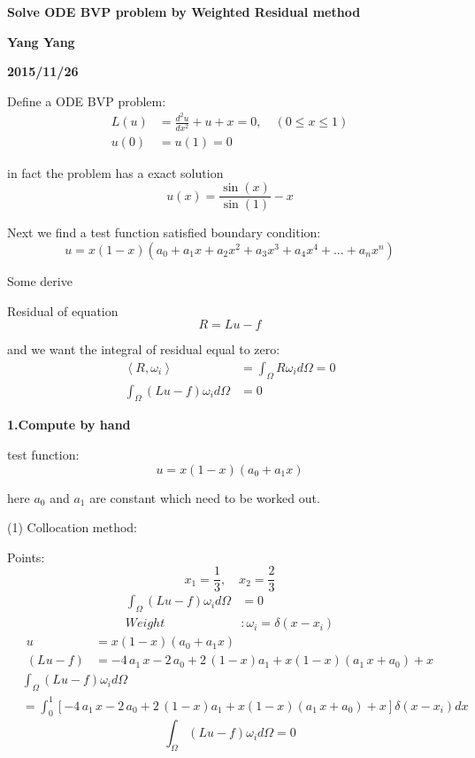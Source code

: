 \documentclass{article}%
\begin{document}
\begin{center}
\textbf{Solve ODE BVP problem by Weighted Residual method}
\end{center}

\begin{flushright}
\textbf{Yang Yang}

\textbf{2015/11/26}
\end{flushright}

Define a ODE BVP problem:%
\begin{align*}
L\left(  u\right)   &  =\frac{d^{2}u}{dx^{2}}+u+x=0,\quad\left(  0\leq
x\leq1\right) \\
u\left(  0\right)   &  =u\left(  1\right)  =0
\end{align*}


in fact the problem has a exact solution%
\[
u\left(  x\right)  =\frac{\sin\left(  x\right)  }{\sin\left(  1\right)  }-x
\]


Next we find a test function satisfied boundary condition:%
\[
u=x\left(  1-x\right)  \left(  a_{0}+a_{1}x+a_{2}x^{2}+a_{3}x^{3}+a_{4}%
x^{4}+...+a_{n}x^{n}\right)
\]


Some derive

Residual of equation%
\[
R=Lu-f
\]


and we want the integral of residual equal to zero:
\begin{align*}
\left\langle R,\omega_{i}\right\rangle  &  =\int_{\Omega}R\omega_{i}%
d\Omega=0\\
\int_{\Omega}\left(  Lu-f\right)  \omega_{i}d\Omega &  =0
\end{align*}


\textbf{1.Compute by hand}

test function:%
\[
u=x\left(  1-x\right)  \left(  a_{0}+a_{1}x\right)
\]


here $a_{0}$ and $a_{1}$ are constant which need to be worked out.

(1) Collocation method:

Points:%
\[
x_{1}=\frac{1}{3},\quad x_{2}=\frac{2}{3}%
\]%
\begin{align*}
\int_{\Omega}\left(  Lu-f\right)  \omega_{i}d\Omega &  =0\\
Weight  &  :\omega_{i}=\delta\left(  x-x_{i}\right)
\end{align*}%
\begin{align*}
u  &  =x\left(  1-x\right)  \left(  a_{0}+a_{1}x\right) \\
\left(  Lu-f\right)   &  =-4\,a_{1}\,x-2\,a_{0}+2\,\left(  1-x\right)
a_{1}+x\left(  1-x\right)  \left(  a_{1}\,x+a_{0}\right)  +x
\end{align*}%
\begin{align*}
&  \int_{\Omega}\left(  Lu-f\right)  \omega_{i}d\Omega\\
&  =\int_{0}^{1}\left[  -4\,a_{1}\,x-2\,a_{0}+2\,\left(  1-x\right)
a_{1}+x\left(  1-x\right)  \left(  a_{1}\,x+a_{0}\right)  +x\right]
\delta\left(  x-x_{i}\right)  dx
\end{align*}%
\[
\int_{\Omega}\left(  Lu-f\right)  \omega_{i}d\Omega=0
\]
\end{document}
